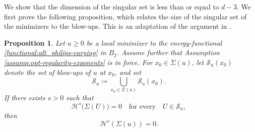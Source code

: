 \documentclass[reqno,11pt]{amsart}
\newtheorem{proposition}{Proposition}[section]
\newcommand{\1}{\mathds{1}}  %
\numberwithin{equation}{section}
\begin{document}
We show that the dimension of the singular set is less than or equal to $d-3$. We first prove the following proposition, which relates the size of the singular set of the minimizers to the blow-ups. This is an adaptation of the argument in \cite{DSS0}.

\begin{proposition}\label{lemma:singular-set-blow_up-to-minimizer}
Let $u \geq 0$ be a local minimizer to the energy-functional \eqref{functional:alt_philips-varying} in $B_2$. Assume further that Assumption \eqref{assump:opt-regularity-exponents} is in force. For $x_0\in \Sigma(u)$, let $\mathcal{S}_u(x_0)$ denote the set of blow-ups of $u$ at $x_0$, and set
\[
    \mathcal{S}_u \coloneqq \bigcup_{x_0\in\Sigma(u)} \mathcal{S}_u(x_0).
\]
If there exists $s>0$ such that
\[
    \mathcal H^s\bigl(\Sigma(U)\bigr)=0 \quad \text{for every} \quad U\in \mathcal{S}_u,
\]
then
\[
    \mathcal H^s(\Sigma(u))=0.
\]
\end{proposition}
\end{document}
